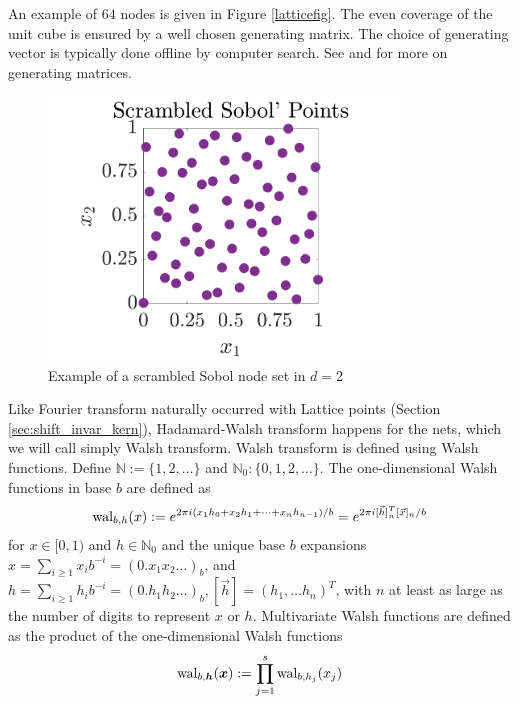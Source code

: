 \documentclass{iitthesis}          %
\newcommand{\bm}[1]{\boldsymbol{#1}}
\newcommand{\naturals}{\mathbb{N}}
\newcommand{\vh}{\bm{h}}
\newcommand{\vx}{\bm{x}}
\begin{document}
An example of $64$ nodes is given in Figure  \ref{latticefig}.  The even coverage of the unit cube is ensured by a well chosen generating matrix.  The choice of generating vector is typically done offline by computer search.  See \cite{KuoNuyens2016} and \cite{NuySoft} for more on generating matrices.
\begin{figure}[htp]
	\centering
	\includegraphics[height=7cm]{SSobolPoints}
	\caption{Example of a scrambled Sobol node set  in $d=2$ \label{sobolfig} }
\end{figure}



Like Fourier transform naturally occurred with Lattice points (Section \ref{sec:shift_invar_kern}), Hadamard-Walsh transform happens for the nets, which we will call simply Walsh transform. Walsh transform  is defined using Walsh functions. Define $\naturals:=\lbrace1,2,\dots \rbrace$ and $\naturals_0 : \lbrace0,1,2,\dots \rbrace$.
The one-dimensional Walsh functions in base $b$ are defined as
\begin{align*}
\textup{wal}_{b,h}(x) := e^{2\pi i (x_1 h_0 + x_2 h_1 + \dots + x_n h_{n-1})/b} 
=
e^{2\pi i [\vec{h}]_n^T[\vec {x}]_n/b}
\end{align*}
for $x \in [0,1)$ and $h \in \naturals_0$ and the unique base $b$ expansions 
$x = \sum_{i \ge 1} x_i b^{-i} = (0.x_1 x_2 \dots)_b$,
and
$h = \sum_{i \ge 1} h_i b^{-i} = (0.h_1 h_2 \dots)_b, [\vec{h}] =  (h_1,\dots h_n)^T$,
with $n$ at least as large as the number of digits to represent $x$ or $h$.
Multivariate Walsh functions are defined as the product of the one-dimensional Walsh functions
\begin{align*}
\textup{wal}_{b,\vh} (\vx) := \prod_{j=1}^s \textup{wal}_{b,h_j} (x_j
)
\end{align*}
\end{document}
